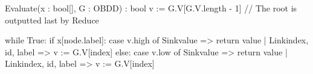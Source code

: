 \begin{blstlisting}
  Evaluate(x : bool[], G : OBDD) : bool
    v := G.V[G.V.length - 1] // The root is outputted last by Reduce

    while True:
      if x[node.label]:
        case v.high of Sink{value}            => return value
                     | Link{index, id, label} => v := G.V[index]
      else:
        case v.low of Sink{value}             => return value
                    | Link{index, id, label}  => v := G.V[index]
\end{blstlisting}
